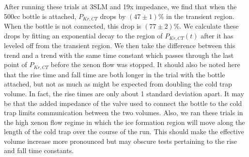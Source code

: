 After running these trials at 3SLM and 19x impedance, we find that when the 500cc bottle is attached, $P_{Kr,CT}$ drops by $(47\pm1)$\% in the transient region. When the bottle is not connected, this drop is $(77\pm2)$\%. We calculate these drops by fitting an exponential decay to the region of $P_{Kr,CT}(t)$ after it has leveled off from the transient region. We then take the difference between this trend and a trend with the same time constant which passes through the last point of $P_{Kr,CT}$ before the xenon flow was stopped. It should also be noted here that the rise time and fall time are both longer in the trial with the bottle attached, but not as much as might be expected from doubling the cold trap volume. In fact, the rise times are only about 1 standard deviation apart. It may be that the added impedance of the valve used to connect the bottle to the cold trap limits communication between the two volumes. Also, we ran these trials in the high xenon flow regime in which the ice formation region will move along the length of the cold trap over the course of the run. This should make the effective volume increase more pronounced but may obscure tests pertaining to the rise and fall time constants.


